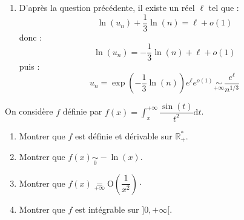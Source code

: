 \documentclass[a4paper,twoside,french,10pt]{VcCours}
\newcommand{\dt}{\text{d}t}
\begin{document}
\begin{enumerate}
\item D'après la question précédente, il existe un réel $\ell$ tel que :
$$ \ln(u_n) + \dfrac{1}{3} \ln(n) = \ell + o(1)$$
donc :
$$ \ln(u_n) = - \dfrac{1}{3} \ln(n) + \ell + o(1)$$
puis :
$$ u_n = \exp \left( - \dfrac{1}{3} \ln(n) \right) e^{\ell} e^{o(1)} \underset{+ \infty}{\sim} \dfrac{e^{\ell}}{n^{1/3}}$$
\end{enumerate}

\begin{Exercice}{} On considère $f$ définie par $f(x)= \int_x^{+ \infty} \dfrac{\sin(t)}{t^2} \dt$.
\begin{enumerate}
\item Montrer que $f$ est définie et dérivable sur $\mathbb{R}_+^{*}$.
\item Montrer que $f(x) \underset{0}{\sim} -\ln(x)$.
\item Montrer que $f(x) \underset{+ \infty}{=} \textrm{O} \left( \dfrac{1}{x^2} \right) \cdot$
\item Montrer que $f$ est intégrable sur $]0, + \infty[$.
\end{enumerate}
\end{Exercice}
\end{document}
